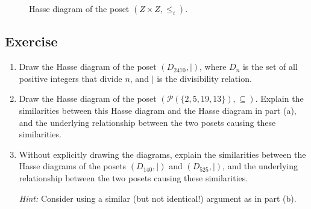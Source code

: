 \documentclass{article}
\newcounter{counter}
\newcommand{\Exercise}{Exercise \stepcounter{counter}\thecounter}
\begin{document}
    \begin{figure}[htbp]
        \centering
        \caption{Hasse diagram of the poset $(Z \times Z, \le_{i})$.}
        \label{fig:Q1}
    \end{figure}

\subsection*{\Exercise}
   \begin{enumerate}
       \item Draw the Hasse diagram of the poset $(D_{2470}, \mid)$, where $D_{n}$ is the set of all positive integers that divide $n$, and $\mid$ is the divisibility relation.
       \item Draw the Hasse diagram of the poset $(\mathcal{P}(\{2, 5, 19, 13\}), \subseteq)$. Explain the similarities between this Hasse diagram and the Hasse diagram in part (a), and the underlying relationship between the two posets causing these similarities.
       \item Without explicitly drawing the diagrams, explain the similarities between the Hasse diagrams of the posets $(D_{140}, \mid)$ and $(D_{525}, \mid)$, and the underlying relationship between the two posets causing these similarities.
       
       \vspace{1.5mm}
       \textit{Hint:} Consider using a similar (but not identical!) argument as in part (b).
   \end{enumerate}
\end{document}
